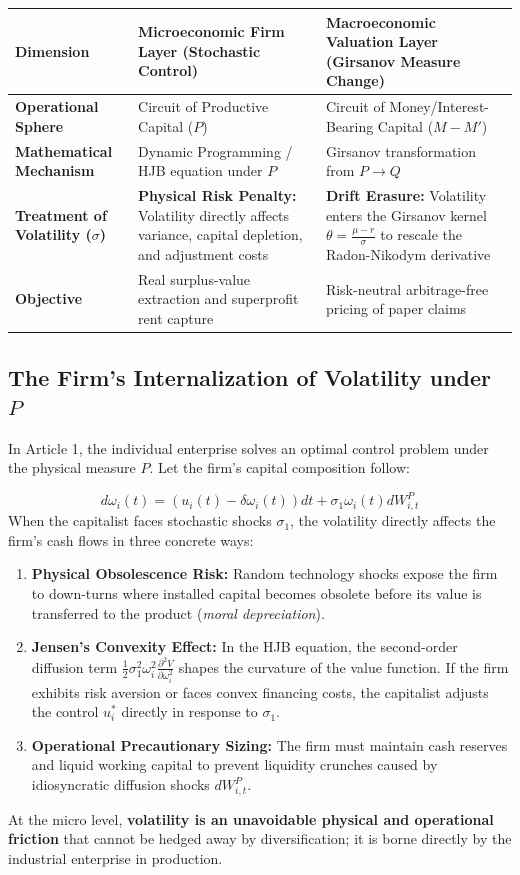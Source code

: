 \documentclass[11pt,letterpaper]{report}
\begin{document}
\begingroup\small\begin{longtable}{|>{\raggedright\arraybackslash}p{}|>{\raggedright\arraybackslash}p{}|>{\raggedright\arraybackslash}p{}|}\hline
Dimension & Microeconomic Firm Layer (Stochastic Control) & Macroeconomic Valuation Layer (Girsanov Measure Change) \\ \hline
\textbf{Operational Sphere} & Circuit of Productive Capital ($P$) & Circuit of Money/Interest-Bearing Capital ($M-M'$) \\ \hline
\textbf{Mathematical Mechanism} & Dynamic Programming / HJB equation under $P$ & Girsanov transformation from $P\rightarrow Q$ \\ \hline
\textbf{Treatment of Volatility ($\sigma$)} & \textbf{Physical Risk Penalty:} Volatility directly affects variance, capital depletion, and adjustment costs & \textbf{Drift Erasure:} Volatility enters the Girsanov kernel $\theta =\frac{\mu -r}{\sigma }$ to rescale the Radon-Nikodym derivative \\ \hline
\textbf{Objective} & Real surplus-value extraction and superprofit rent capture & Risk-neutral arbitrage-free pricing of paper claims \\ \hline
\end{longtable}\endgroup
\subsection{The Firm's Internalization of Volatility under $P$}
In Article 1, the individual enterprise solves an optimal control problem under the physical measure $P$. Let the firm's capital composition follow:

\[
d{\omega }_{i}(t)=\left({{u}_{i}(t)-\delta {\omega }_{i}(t)}\right)dt+{\sigma }_{1}{\omega }_{i}(t)d{W}_{i,t}^{P}
\]
When the capitalist faces stochastic shocks ${\sigma }_{1}$, the volatility directly affects the firm's cash flows in three concrete ways:

\begin{enumerate}
\item \textbf{Physical Obsolescence Risk:} Random technology shocks expose the firm to down-turns where installed capital becomes obsolete before its value is transferred to the product (\emph{moral depreciation}).
\item \textbf{Jensen's Convexity Effect:} In the HJB equation, the second-order diffusion term $\frac{1}{2}{\sigma }_{1}^{2}{\omega }_{i}^{2}\frac{{\partial }^{2}V}{\partial {\omega }_{i}^{2}}$ shapes the curvature of the value function. If the firm exhibits risk aversion or faces convex financing costs, the capitalist adjusts the control ${u}_{i}^{*}$ directly in response to ${\sigma }_{1}$.
\item \textbf{Operational Precautionary Sizing:} The firm must maintain cash reserves and liquid working capital to prevent liquidity crunches caused by idiosyncratic diffusion shocks $d{W}_{i,t}^{P}$.
\end{enumerate}
At the micro level, \textbf{volatility is an unavoidable physical and operational friction} that cannot be hedged away by diversification; it is borne directly by the industrial enterprise in production.
\end{document}
